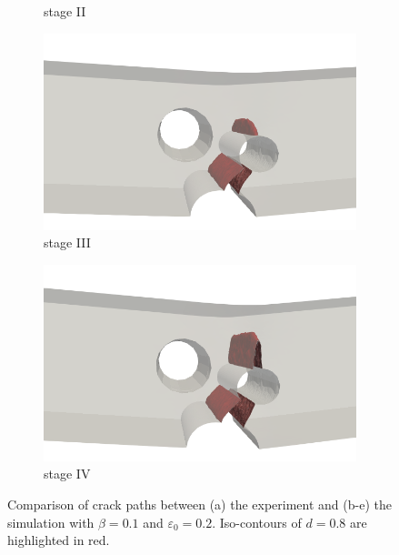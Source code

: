 \begin{figure}[!htb]
\begin{minipage}{0.6\textwidth}
\begin{subfigure}{0.45\textwidth}
      \caption{stage II}
      \label{fig: Chapter5/3pb/1234/simulation_II}
    \end{subfigure}
    
    \begin{subfigure}{0.45\textwidth}
      \centering
      \includegraphics[width=\linewidth]{Chapter5/figures/3pb/III}
      \caption{stage III}
      \label{fig: Chapter5/3pb/1234/simulation_III}
    \end{subfigure}
    \begin{subfigure}{0.45\textwidth}
      \centering
      \includegraphics[width=\linewidth]{Chapter5/figures/3pb/IV}
      \caption{stage IV}
      \label{fig: Chapter5/3pb/1234/simulation_IV}
    \end{subfigure}
  \end{minipage}
  \caption{Comparison of crack paths between (a) the experiment \cite{kubik2019ductile} and (b-e) the simulation with $\beta = 0.1$ and $\varepsilon_0 = 0.2$. Iso-contours of $d=0.8$ are highlighted in red. }
  \label{fig: Chapter5/3pb/1234}
\end{figure}
